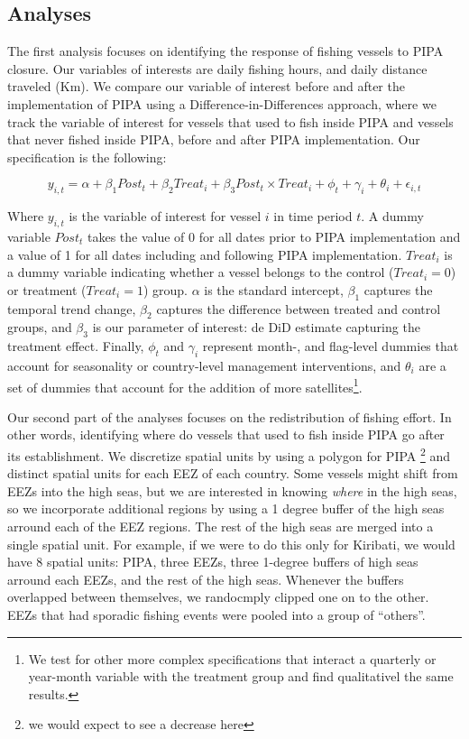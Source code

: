 \documentclass[11pt,]{article}
\let\rmarkdownfootnote\footnote%
\def\footnote{\protect\rmarkdownfootnote}
\begin{document}
\hypertarget{analyses}{%
\subsection{Analyses}\label{analyses}}

The first analysis focuses on identifying the response of fishing
vessels to PIPA closure. Our variables of interests are daily fishing
hours, and daily distance traveled (Km). We compare our variable of
interest before and after the implementation of PIPA using a
Difference-in-Differences approach, where we track the variable of
interest for vessels that used to fish inside PIPA and vessels that
never fished inside PIPA, before and after PIPA implementation. Our
specification is the following:

\[
y_{i,t} = \alpha + \beta_1 Post_t + \beta_2 Treat_i + \beta_3 Post_t \times Treat_i + \phi_t + \gamma_i + \theta_i + \epsilon_{i,t}
\]

Where \(y_{i,t}\) is the variable of interest for vessel \(i\) in time
period \(t\). A dummy variable \(Post_t\) takes the value of 0 for all
dates prior to PIPA implementation and a value of 1 for all dates
including and following PIPA implementation. \(Treat_i\) is a dummy
variable indicating whether a vessel belongs to the control
(\(Treat_i = 0\)) or treatment (\(Treat_i = 1\)) group. \(\alpha\) is
the standard intercept, \(\beta_1\) captures the temporal trend change,
\(\beta_2\) captures the difference between treated and control groups,
and \(\beta_3\) is our parameter of interest: de DiD estimate capturing
the treatment effect. Finally, \(\phi_t\) and \(\gamma_i\) represent
month-, and flag-level dummies that account for seasonality or
country-level management interventions, and \(\theta_i\) are a set of
dummies that account for the addition of more
satellites\footnote{We test for other more complex specifications that interact a quarterly or year-month variable with the treatment group and find qualitativel the same results.}.

Our second part of the analyses focuses on the redistribution of fishing
effort. In other words, identifying where do vessels that used to fish
inside PIPA go after its establishment. We discretize spatial units by
using a polygon for PIPA
\footnote{we would expect to see a decrease here} and distinct spatial
units for each EEZ of each country. Some vessels might shift from EEZs
into the high seas, but we are interested in knowing \emph{where} in the
high seas, so we incorporate additional regions by using a 1 degree
buffer of the high seas arround each of the EEZ regions. The rest of the
high seas are merged into a single spatial unit. For example, if we were
to do this only for Kiribati, we would have 8 spatial units: PIPA, three
EEZs, three 1-degree buffers of high seas arround each EEZs, and the
rest of the high seas. Whenever the buffers overlapped between
themselves, we randocmply clipped one on to the other. EEZs that had
sporadic fishing events were pooled into a group of ``others''.
\end{document}

